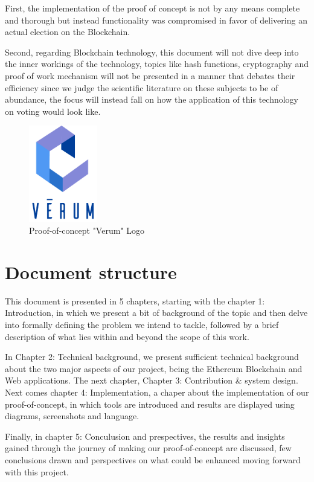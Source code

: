 First, the implementation of the proof of concept is not by any means complete and thorough but instead functionality was compromised in favor of delivering an actual election on the Blockchain.

Second, regarding Blockchain technology, this document will not dive deep into the inner workings of the technology, topics like hash functions, cryptography and proof of work mechanism will not be presented in a manner that debates their efficiency since we judge the scientific literature on these subjects to be of abundance, the focus will instead fall on how the application of this technology on voting would look like.

\vspace{2cm}

\begin{figure}[h]
	\centering
		\includegraphics[width=3cm]{images/chapter1/verum.png}
		\caption{{\footnotesize Proof-of-concept "Verum" Logo}}
\end{figure}\newpage

\section{Document structure}
This document is presented in 5 chapters, starting with the chapter 1: Introduction, in which we present a bit of background of the topic and then delve into formally defining the problem we intend to tackle, followed by a brief description of what lies within and beyond the scope of this work.

In Chapter 2: Technical background, we present sufficient technical background about the two major aspects of our project, being the Ethereum Blockchain and Web applications. The next chapter, Chapter 3: Contribution \& system design. Next comes chapter 4: Implementation, a chaper about the implementation of our proof-of-concept, in which tools are introduced and results are displayed using diagrams, screenshots and language.

Finally, in chapter 5: Conculusion and prespectives, the results and insights gained through the journey of making our proof-of-concept are discussed, few conclusions drawn and perspectives on what could be enhanced moving forward with this project.